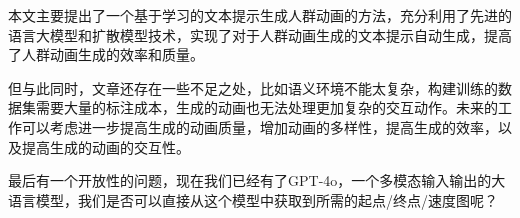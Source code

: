 本文主要提出了一个基于学习的文本提示生成人群动画的方法，充分利用了先进的语言大模型和扩散模型技术，实现了对于人群动画生成的文本提示自动生成，提高了人群动画生成的效率和质量。

但与此同时，文章还存在一些不足之处，比如语义环境不能太复杂，构建训练的数据集需要大量的标注成本，生成的动画也无法处理更加复杂的交互动作。未来的工作可以考虑进一步提高生成的动画质量，增加动画的多样性，提高生成的效率，以及提高生成的动画的交互性。

最后有一个开放性的问题，现在我们已经有了GPT-4o，一个多模态输入输出的大语言模型，我们是否可以直接从这个模型中获取到所需的起点/终点/速度图呢？